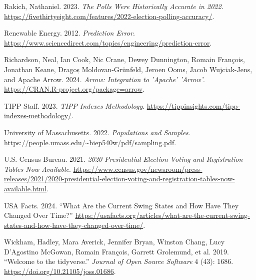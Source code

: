 \documentclass[
  letterpaper,
  DIV=11,
  numbers=noendperiod]{scrartcl}
\newlength{\cslhangindent}
\newlength{\cslentryspacingunit} %
\newenvironment{CSLReferences}[2] %
 {%
  \setlength{\parindent}{0pt}
  \ifodd #1
  \let\oldpar\par
  \def\par{\hangindent=\cslhangindent\oldpar}
  \fi
  \setlength{\parskip}{#2\cslentryspacingunit}
 }%
 {}
\begin{document}
\begin{CSLReferences}{1}{0}
\leavevmode{}%
Rakich, Nathaniel. 2023. \emph{The Polls Were Historically Accurate in
2022}.
\url{https://fivethirtyeight.com/features/2022-election-polling-accuracy/}.

\leavevmode{}%
Renewable Energy. 2012. \emph{Prediction Error}.
\url{https://www.sciencedirect.com/topics/engineering/prediction-error}.

\leavevmode{}%
Richardson, Neal, Ian Cook, Nic Crane, Dewey Dunnington, Romain
François, Jonathan Keane, Dragoș Moldovan-Grünfeld, Jeroen Ooms, Jacob
Wujciak-Jens, and Apache Arrow. 2024. \emph{Arrow: Integration to
'Apache' 'Arrow'}. \url{https://CRAN.R-project.org/package=arrow}.

\leavevmode{}%
TIPP Staff. 2023. \emph{TIPP Indexes Methodology}.
\url{https://tippinsights.com/tipp-indexes-methodology/}.

\leavevmode{}%
University of Massachusetts. 2022. \emph{Populations and Samples}.
\url{https://people.umass.edu/~biep540w/pdf/sampling.pdf}.

\leavevmode{}%
U.S. Census Bureau. 2021. \emph{2020 Presidential Election Voting and
Registration Tables Now Available}.
\url{https://www.census.gov/newsroom/press-releases/2021/2020-presidential-election-voting-and-registration-tables-now-available.html}.

\leavevmode{}%
USA Facts. 2024. {``{What Are the Current Swing States and How Have They
Changed Over Time?}''}
\url{https://usafacts.org/articles/what-are-the-current-swing-states-and-how-have-they-changed-over-time/}.

\leavevmode{}%
Wickham, Hadley, Mara Averick, Jennifer Bryan, Winston Chang, Lucy
D'Agostino McGowan, Romain François, Garrett Grolemund, et al. 2019.
{``Welcome to the {tidyverse}.''} \emph{Journal of Open Source Software}
4 (43): 1686. \url{https://doi.org/10.21105/joss.01686}.

\end{CSLReferences}
\end{document}
